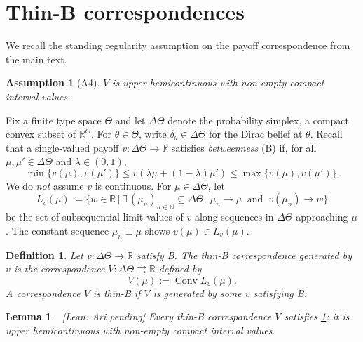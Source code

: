 \documentclass[11pt]{article}
\newtheorem{lemma}{Lemma}
\newtheorem{definition}{Definition}
\newtheorem{assumption}{Assumption}
\newcommand{\sep}{\,|\,}
\newcommand{\arileanpending}{{\footnotesize\textsf{\textcolor{orange!80!black}{[Lean: Ari pending]}}}}
\begin{document}
\section*{Thin-B correspondences}

We recall the standing regularity assumption on the payoff correspondence from
the main text.
\begin{assumption}[A4]\label{A4:V-uhc}
    $V$ is upper hemicontinuous with non-empty compact interval values.
\end{assumption}

Fix a finite type space $\Theta$ and let $\Delta\Theta$ denote the probability
simplex, a compact convex subset of $\mathbb{R}^\Theta$. For $\theta\in\Theta$,
write $\delta_\theta\in\Delta\Theta$ for the Dirac belief at $\theta$. Recall
that a single-valued payoff $v:\Delta\Theta\to\mathbb{R}$ satisfies
\emph{betweenness} (B) if, for all $\mu,\mu'\in\Delta\Theta$ and $\lambda\in(0,1)$,
\[
    \min\{v(\mu),v(\mu')\}
    \leq
    v(\lambda\mu+(1-\lambda)\mu')
    \leq
    \max\{v(\mu),v(\mu')\}.
\]
We do \emph{not} assume $v$ is continuous. For $\mu\in\Delta\Theta$, let
\[
    L_v(\mu)
    :=
    \bigl\{
        w\in\mathbb{R}
        \sep
        \exists\,(\mu_n)_{n\in\mathbb{N}}\subseteq\Delta\Theta,\
        \mu_n\to\mu\ \text{ and }\ v(\mu_n)\to w
    \bigr\}
\]
be the set of subsequential limit values of $v$ along sequences in $\Delta\Theta$
approaching $\mu$. The constant sequence $\mu_n\equiv\mu$ shows $v(\mu)\in L_v(\mu)$.

\begin{definition}\label{dfn:thinB}
    Let $v:\Delta\Theta\to\mathbb{R}$ satisfy B. The \emph{thin-B correspondence
    generated by $v$} is the correspondence $V:\Delta\Theta\rightrightarrows\mathbb{R}$
    defined by
    \[
        V(\mu):=\operatorname{Conv}L_v(\mu).
    \]
    A correspondence $V$ is \emph{thin-B} if $V$ is generated by some
    $v$ satisfying B.
\end{definition}

\begin{lemma}\label{lem:thinB-A4}\ \arileanpending
    Every thin-B correspondence $V$ satisfies \cref{A4:V-uhc}: it is upper
    hemicontinuous with non-empty compact interval values.
\end{lemma}
\end{document}

